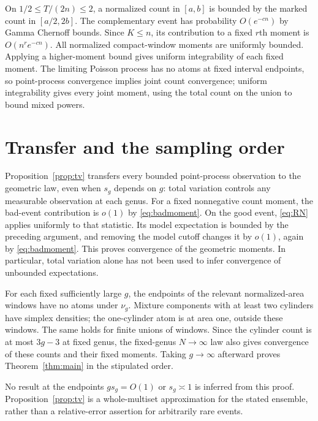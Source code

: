 \documentclass[11pt]{article}
\theoremstyle{remark}\newtheorem{remark}[theorem]{Remark}
\begin{document}
On $1/2\le T/(2n)\le2$, a normalized count in $[a,b]$ is bounded by the marked count in $[a/2,2b]$. The complementary event has probability $O(e^{-c n})$ by Gamma Chernoff bounds. Since $K\le n$, its contribution to a fixed $r$th moment is $O(n^re^{-cn})$. All normalized compact-window moments are uniformly bounded. Applying a higher-moment bound gives uniform integrability of each fixed moment. The limiting Poisson process has no atoms at fixed interval endpoints, so point-process convergence implies joint count convergence; uniform integrability gives every joint moment, using the total count on the union to bound mixed powers.

\section{Transfer and the sampling order}

Proposition~\ref{prop:tv} transfers every bounded point-process observation to the geometric law, even when $s_g$ depends on $g$: total variation controls any measurable observation at each genus. For a fixed nonnegative count moment, the bad-event contribution is $o(1)$ by \eqref{eq:badmoment}. On the good event, \eqref{eq:RN} applies uniformly to that statistic. Its model expectation is bounded by the preceding argument, and removing the model cutoff changes it by $o(1)$, again by \eqref{eq:badmoment}. This proves convergence of the geometric moments. In particular, total variation alone has not been used to infer convergence of unbounded expectations.

For each fixed sufficiently large $g$, the endpoints of the relevant normalized-area windows have no atoms under $\nu_g$. Mixture components with at least two cylinders have simplex densities; the one-cylinder atom is at area one, outside these windows. The same holds for finite unions of windows. Since the cylinder count is at most $3g-3$ at fixed genus, the fixed-genus $N\to\infty$ law also gives convergence of these counts and their fixed moments. Taking $g\to\infty$ afterward proves Theorem~\ref{thm:main} in the stipulated order.

No result at the endpoints $gs_g=O(1)$ or $s_g\asymp1$ is inferred from this proof. Proposition~\ref{prop:tv} is a whole-multiset approximation for the stated ensemble, rather than a relative-error assertion for arbitrarily rare events.
\end{document}
